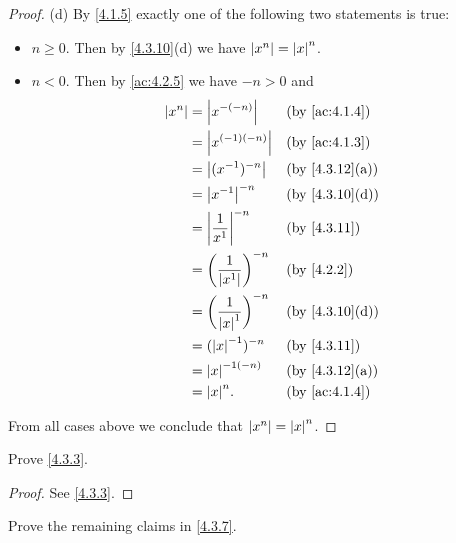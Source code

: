 \begin{proof}{(d)}
	By \cref{4.1.5} exactly one of the following two statements is true:
	\begin{itemize}
		\item \(n \geq 0\).
		      Then by \cref{4.3.10}(d) we have \(\left\lvert x^n\right\rvert = \left\lvert x\right\rvert^n\).
		\item \(n < 0\).
		      Then by \cref{ac:4.2.5} we have \(-n > 0\) and
		      \begin{align*}
			      \abs{x^n} & = \abs{x^{-(-n)}}                       &  & \by{ac:4.1.4}                \\
			                & = \abs{x^{(-1)(-n)}}                    &  & \by{ac:4.1.3}                \\
			                & = \abs{(x^{-1})^{-n}}                   &  & \text{(by \cref{4.3.12}(a))} \\
			                & = \abs{x^{-1}}^{-n}                     &  & \text{(by \cref{4.3.10}(d))} \\
			                & = \abs{\dfrac{1}{x^1}}^{-n}             &  & \by{4.3.11}                  \\
			                & = \bigg(\dfrac{1}{\abs{x^1}}\bigg)^{-n} &  & \by{4.2.2}                   \\
			                & = \bigg(\dfrac{1}{\abs{x}^1}\bigg)^{-n} &  & \text{(by \cref{4.3.10}(d))} \\
			                & = (\abs{x}^{-1})^{-n}                   &  & \by{4.3.11}                  \\
			                & = \abs{x}^{-1(-n)}                      &  & \text{(by \cref{4.3.12}(a))} \\
			                & = \abs{x}^n.                            &  & \by{ac:4.1.4}
		      \end{align*}
	\end{itemize}
	From all cases above we conclude that \(\left\lvert x^n\right\rvert = \left\lvert x\right\rvert^n\).
\end{proof}

\exercisesection

\begin{ex}\label{ex:4.3.1}
	Prove \cref{4.3.3}.
\end{ex}

\begin{proof}
	See \cref{4.3.3}.
\end{proof}

\begin{ex}\label{ex:4.3.2}
	Prove the remaining claims in \cref{4.3.7}.
\end{ex}

